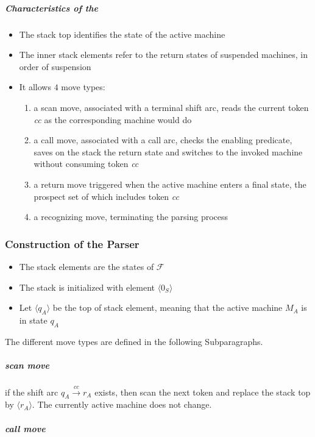 \documentclass[english]{article}
\begin{document}
\subparagraph*{Characteristics of the \DPDA}
\begin{itemize}
  \item The stack top identifies the state of the active machine
  \item The inner stack elements refer to the return states of suspended machines, in order of suspension
  \item It allows \(4\) move types:
        \begin{enumerate}
          \item a scan move, associated with a terminal shift arc, reads the current token \textit{cc} as the corresponding machine would do
          \item a call move, associated with a call arc, checks the enabling predicate, saves on the stack the return state and switches to the invoked machine without consuming token \textit{cc}
          \item a return move triggered when the active machine enters a final state, the prospect set of which includes token \textit{cc}
          \item a recognizing move, terminating the parsing process
        \end{enumerate}
\end{itemize}

\subsubsection[Construction of the ELL(1) Parser]{Construction of the \ello Parser}

\begin{itemize}
  \item The stack elements are the states of \PCFG \(\mathcal{F}\)
  \item The stack is initialized with element \(\langle 0_S \rangle\)
  \item Let \(\langle q_A \rangle\) be the top of stack element, meaning that the active machine \(M_A\) is in state \(q_A\)
\end{itemize}

The different move types are defined in the following Subparagraphs.

\subparagraph*{scan move}

if the shift arc \(q_A \xrightarrow{\textit{cc}} r_A\) exists, then scan the next token and replace the stack top by \(\langle r_A\rangle\).
The currently active machine does not change.

\subparagraph*{call move}
\end{document}
